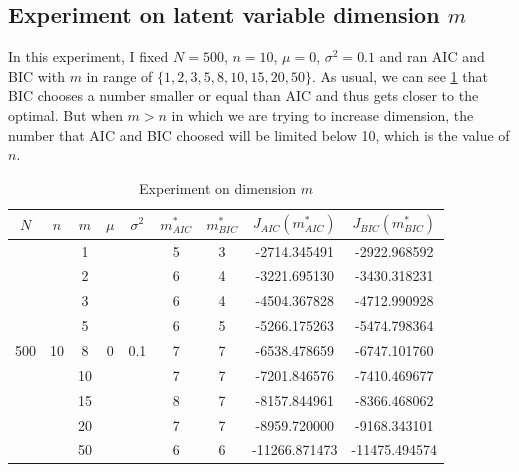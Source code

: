 \documentclass{article}
\begin{document}
\subsection{Experiment on latent variable dimension $m$}
In this experiment, I fixed $N=500$, $n=10$, $\mu=0$, $\sigma^2=0.1$ and ran AIC and BIC with $m$ in range of $\{1, 2, 3, 5, 8, 10, 15, 20, 50\}$.
As usual, we can see \ref{m} that BIC chooses a number smaller or equal than AIC and thus gets closer to the optimal. 
But when $m>n$ in which we are trying to increase dimension, the number that AIC and BIC choosed will be limited below 10, which is the value of $n$.
\begin{table}[htbp]
	\centering
	\newcommand{\tabincell}[2]{\begin{tabular}{@{}#1@{}}#2\end{tabular}}
	\renewcommand\arraystretch{1.0}
	\caption{Experiment on dimension $m$}
	\label{m}%
	\begin{tabular}{c|c|c|c|c|c|c|c|c}
    $N$ & $n$ & $m$ & $\mu$ & $\sigma^2$ & $m^*_{AIC}$ & $m^*_{BIC}$ & $J_{AIC}(m^*_{AIC})$ &$J_{BIC}(m^*_{BIC})$\\
    \hline
		\multirow{9}{*}{500} & \multirow{9}{*}{10} & 1 & \multirow{9}{*}{0} & \multirow{9}{*}{0.1} & 5 & 3 & -2714.345491 & -2922.968592\\
     & & 2 & & & 6 & 4 & -3221.695130 & -3430.318231\\
     & & 3 & & & 6 & 4 & -4504.367828 & -4712.990928\\
     & & 5 & & & 6 & 5 & -5266.175263 & -5474.798364\\
     & & 8 & & & 7 & 7 & -6538.478659 & -6747.101760\\
     & & 10 & & & 7 & 7 & -7201.846576 & -7410.469677\\
     & & 15 & & & 8 & 7 & -8157.844961 & -8366.468062\\
     & & 20 & & & 7 & 7 & -8959.720000 & -9168.343101\\
     & & 50 & & & 6 & 6 & -11266.871473 & -11475.494574\\
		\hline
\end{tabular}
\end{table}
\end{document}
